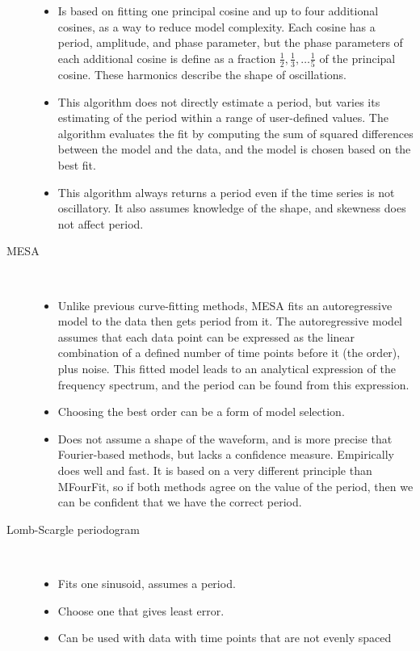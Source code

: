 \begin{description}
        \begin{itemize}
          \item Is based on fitting one principal cosine and up to four additional cosines, as a way to reduce model complexity.
                Each cosine has a period, amplitude, and phase parameter, but the phase parameters of each additional cosine is define as a fraction $\frac{1}{2}, \frac{1}{3}, \ldots \frac{1}{5}$ of the principal cosine.  These harmonics describe the shape of oscillations.
          \item This algorithm does not directly estimate a period, but varies its estimating of the period within a range of user-defined values.
                The algorithm evaluates the fit by computing the sum of squared differences between the model and the data, and the model is chosen based on the best fit.
          \item This algorithm always returns a period even if the time series is not oscillatory.
                It also assumes knowledge of the shape, and skewness does not affect period.
        \end{itemize}

    \item [MESA] \hfill \\

        \begin{itemize}
          \item Unlike previous curve-fitting methods, MESA fits an autoregressive model to the data then gets period from it.
                The autoregressive model assumes that each data point can be expressed as the linear combination of a defined number of time points before it (the order), plus noise.
                This fitted model leads to an analytical expression of the frequency spectrum, and the period can be found from this expression.
          \item Choosing the best order can be a form of model selection.
          \item Does not assume a shape of the waveform, and is more precise that Fourier-based methods, but lacks a confidence measure.
                Empirically does well and fast.
                It is based on a very different principle than MFourFit, so if both methods agree on the value of the period, then we can be confident that we have the correct period.
        \end{itemize}

    \item [Lomb-Scargle periodogram] \hfill \\

        \begin{itemize}
            \item Fits one sinusoid, assumes a period.
            \item Choose one that gives least error.
            \item Can be used with data with time points that are not evenly spaced
        \end{itemize}

\end{description}

